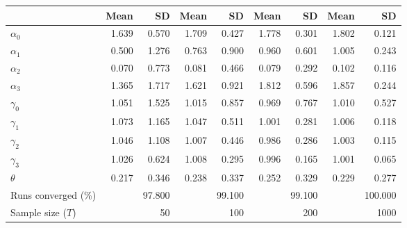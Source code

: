 
\begin{tabular}[t]{lrrrrrrrr}
\toprule
  & Mean & SD & Mean  & SD  & Mean   & SD   & Mean    & SD   \\
\midrule
$\alpha_{0}$ & 1.639 & 0.570 & 1.709 & 0.427 & 1.778 & 0.301 & 1.802 & 0.121\\
$\alpha_{1}$ & 0.500 & 1.276 & 0.763 & 0.900 & 0.960 & 0.601 & 1.005 & 0.243\\
$\alpha_{2}$ & 0.070 & 0.773 & 0.081 & 0.466 & 0.079 & 0.292 & 0.102 & 0.116\\
$\alpha_{3}$ & 1.365 & 1.717 & 1.621 & 0.921 & 1.812 & 0.596 & 1.857 & 0.244\\
$\gamma_{0}$ & 1.051 & 1.525 & 1.015 & 0.857 & 0.969 & 0.767 & 1.010 & 0.527\\
$\gamma_{1}$ & 1.073 & 1.165 & 1.047 & 0.511 & 1.001 & 0.281 & 1.006 & 0.118\\
$\gamma_{2}$ & 1.046 & 1.108 & 1.007 & 0.446 & 0.986 & 0.286 & 1.003 & 0.115\\
$\gamma_{3}$ & 1.026 & 0.624 & 1.008 & 0.295 & 0.996 & 0.165 & 1.001 & 0.065\\
$\theta$ & 0.217 & 0.346 & 0.238 & 0.337 & 0.252 & 0.329 & 0.229 & 0.277\\
Runs converged (\%) &  & 97.800 &  & 99.100 &  & 99.100 &  & 100.000\\
Sample size ($T$) &  & 50 &  & 100 &  & 200 &  & 1000\\
\bottomrule
\end{tabular}
